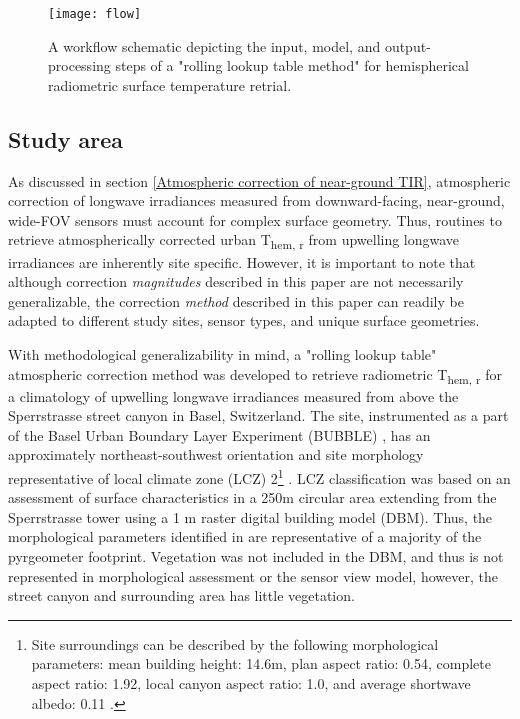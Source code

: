\begin{bibunit}
\begin{figure}[!ht]
	\texttt{[image: flow]}
	\caption{A workflow schematic depicting the input, model, and output-processing steps of a "rolling lookup table method" for hemispherical radiometric surface temperature retrial.}
	\label{flow}
\end{figure}

\subsection{Study area}

As discussed in section \ref{Atmospheric correction of near-ground TIR}, atmospheric correction of longwave irradiances measured from downward-facing, near-ground, wide-FOV sensors must account for complex surface geometry. Thus, routines to retrieve atmospherically corrected urban T\textsubscript{hem, r} from upwelling longwave irradiances are inherently site specific. However, it is important to note that although correction \textit{magnitudes} described in this paper are not necessarily generalizable, the correction \textit{method} described in this paper can readily be adapted to different study sites, sensor types, and unique surface geometries.

With methodological generalizability in mind, a "rolling lookup table" atmospheric correction method was developed to retrieve radiometric T\textsubscript{hem, r} for a climatology of upwelling longwave irradiances measured from above the Sperrstrasse street canyon in Basel, Switzerland. The site, instrumented as a part of the Basel Urban Boundary Layer Experiment (BUBBLE) \cite{Rotach2005}, has an approximately northeast-southwest orientation and site morphology representative of local climate zone (LCZ) 2\footnote{Site surroundings can be described by the following morphological parameters: mean building height: 14.6m, plan aspect ratio: 0.54, complete aspect ratio: 1.92, local canyon aspect ratio: 1.0, and average shortwave albedo: 0.11 \cite{Rotach2005}.} \cite{Stewart2012}. LCZ classification was based on an assessment of surface characteristics in a 250m circular area extending from the Sperrstrasse tower using a 1 \si{m} raster digital building model (DBM). Thus, the morphological parameters identified in \cite{Rotach2005} are representative of a majority of the pyrgeometer footprint. Vegetation was not included in the DBM, and thus is not represented in morphological assessment or the sensor view model, however, the street canyon and surrounding area has little vegetation.


\end{bibunit}

